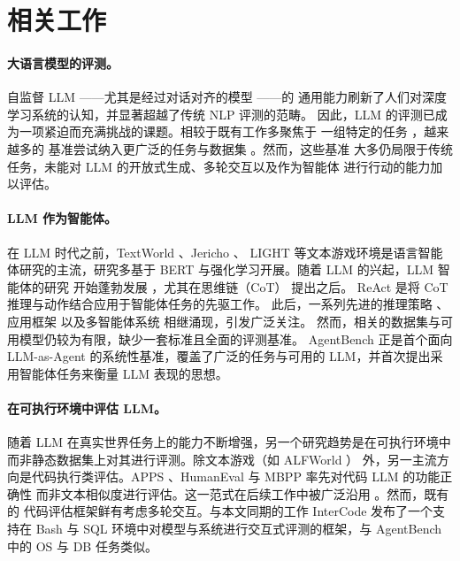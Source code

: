 
\section{相关工作}

\paragraph{大语言模型的评测。}
自监督 LLM \citep{liu2021sl}——尤其是经过对话对齐的模型
\citep{brown2020,chowdhery2022,zhang2022,scao2022,zeng2022,touvron2023,ouyang2022,anthropic2023a,openai2023}——的
通用能力刷新了人们对深度学习系统的认知，并显著超越了传统 NLP 评测的范畴。
因此，LLM 的评测已成为一项紧迫而充满挑战的课题。相较于既有工作多聚焦于
一组特定的任务 \citep{wang2019superglue,gehrmann2021gem}，越来越多的
基准尝试纳入更广泛的任务与数据集
\citep{hendrycks2021b,liang2022holistic,srivastava2023}。然而，这些基准
大多仍局限于传统任务，未能对 LLM 的开放式生成、多轮交互以及作为智能体
进行行动的能力加以评估。

\paragraph{LLM 作为智能体。}
在 LLM 时代之前，TextWorld \citep{cote2019}、Jericho \citep{hausknecht2020}、
LIGHT \citep{urbanek2019} 等文本游戏环境是语言智能体研究的主流，研究多基于
BERT \citep{devlin2019} 与强化学习开展。随着 LLM 的兴起，LLM 智能体的研究
开始蓬勃发展 \citep{huang2022}，尤其在思维链（CoT）\citep{wei2022b} 提出之后。
ReAct \citep{yao2023b} 是将 CoT 推理与动作结合应用于智能体任务的先驱工作。
此后，一系列先进的推理策略
\citep{kim2023,shinn2023,wang2023d,liu2023,yao2023a,gu2023discriminate}、
应用框架 \citep{autogpt,babyagi,agentgpt} 以及多智能体系统
\citep{park2023,hong2023metagpt,wu2023autogen} 相继涌现，引发广泛关注。
然而，相关的数据集与可用模型仍较为有限，缺少一套标准且全面的评测基准。
AgentBench 正是首个面向 LLM-as-Agent 的系统性基准，覆盖了广泛的任务与可用的
LLM，并首次提出采用智能体任务来衡量 LLM 表现的思想。

\paragraph{在可执行环境中评估 LLM。}
随着 LLM 在真实世界任务上的能力不断增强，另一个研究趋势是在可执行环境中
而非静态数据集上对其进行评测。除文本游戏（如 ALFWorld \citep{shridhar2020b}）
外，另一主流方向是代码执行类评估。APPS \citep{hendrycks2021a}、HumanEval
\citep{chen2021} 与 MBPP \citep{austin2021} 率先对代码 LLM 的功能正确性
而非文本相似度进行评估。这一范式在后续工作中被广泛沿用
\citep{li2022alphacode,zheng2023codegeex,nijkamp2023codegen}。然而，既有的
代码评估框架鲜有考虑多轮交互。与本文同期的工作 InterCode \citep{yang2023}
发布了一个支持在 Bash 与 SQL 环境中对模型与系统进行交互式评测的框架，与
AgentBench 中的 OS 与 DB 任务类似。
